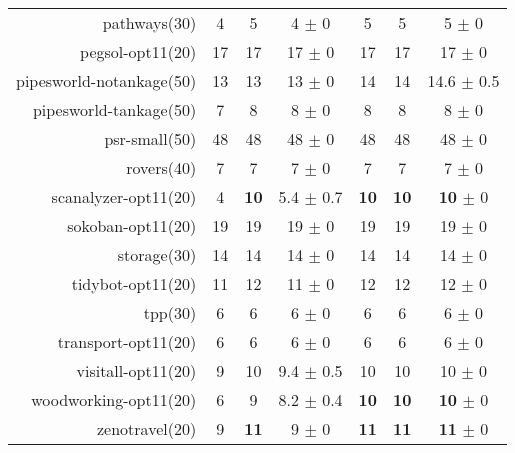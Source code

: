 \begin{center}
\begin{tabular}{|r|*{2}{ccc|}}
pathways(30) & 4 & 5 & 4 \(\pm\) 0 & 5 & 5 & 5 \(\pm\) 0\\
pegsol-opt11(20) & 17 & 17 & 17 \(\pm\) 0 & 17 & 17 & 17 \(\pm\) 0\\
pipesworld-notankage(50) & 13 & 13 & 13 \(\pm\) 0 & 14 & 14 & 14.6 \(\pm\) 0.5\\
pipesworld-tankage(50) & 7 & 8 & 8 \(\pm\) 0 & 8 & 8 & 8 \(\pm\) 0\\
psr-small(50) & 48 & 48 & 48 \(\pm\) 0 & 48 & 48 & 48 \(\pm\) 0\\
rovers(40) & 7 & 7 & 7 \(\pm\) 0 & 7 & 7 & 7 \(\pm\) 0\\
scanalyzer-opt11(20) & 4 & \textbf{10} & 5.4 \(\pm\) 0.7 & \textbf{10} & \textbf{10} & \textbf{10} \(\pm\) 0\\
sokoban-opt11(20) & 19 & 19 & 19 \(\pm\) 0 & 19 & 19 & 19 \(\pm\) 0\\
storage(30) & 14 & 14 & 14 \(\pm\) 0 & 14 & 14 & 14 \(\pm\) 0\\
tidybot-opt11(20) & 11 & 12 & 11 \(\pm\) 0 & 12 & 12 & 12 \(\pm\) 0\\
tpp(30) & 6 & 6 & 6 \(\pm\) 0 & 6 & 6 & 6 \(\pm\) 0\\
transport-opt11(20) & 6 & 6 & 6 \(\pm\) 0 & 6 & 6 & 6 \(\pm\) 0\\
visitall-opt11(20) & 9 & 10 & 9.4 \(\pm\) 0.5 & 10 & 10 & 10 \(\pm\) 0\\
woodworking-opt11(20) & 6 & 9 & 8.2 \(\pm\) 0.4 & \textbf{10} & \textbf{10} & \textbf{10} \(\pm\) 0\\
zenotravel(20) & 9 & \textbf{11} & 9 \(\pm\) 0 & \textbf{11} & \textbf{11} & \textbf{11} \(\pm\) 0\\
\end{tabular}
\end{center}
